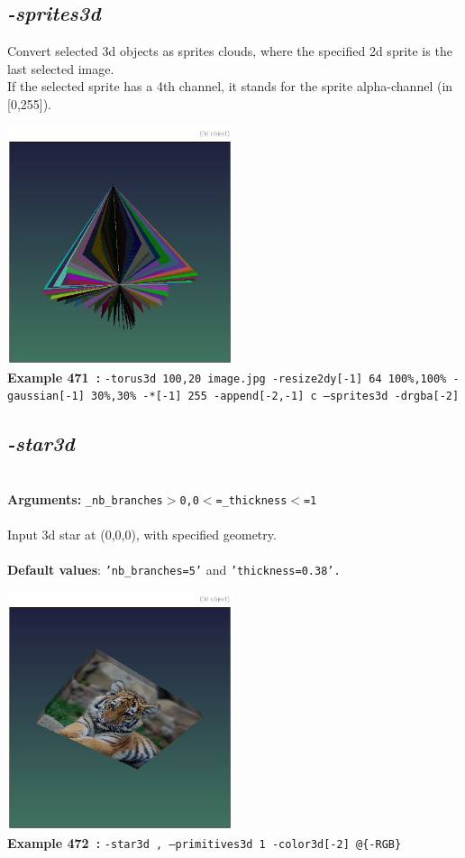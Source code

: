 \documentclass[a4paper,11pt,twoside]{book}
\begin{document}
\subsection{\emph{-sprites3d} }\vspace*{-0.5em}
Convert selected 3d objects as sprites clouds, where the specified 2d sprite is the last selected image.
~\\If the selected sprite has a 4th channel, it stands for the sprite alpha-channel (in [0,255]).
\begin{center}\includegraphics[keepaspectratio=true,height=7cm,width=\textwidth]{img/gmic_def471.jpg}\\
{\footnotesize \textbf{Example 471~:} \texttt{-torus3d 100,20 image.jpg -resize2dy[-1] 64 100\%,100\% -gaussian[-1] 30\%,30\% -*[-1] 255 -append[-2,-1] c --sprites3d -drgba[-2]}}
\end{center}

\subsection{\emph{-star3d} }\vspace*{-0.5em}
~\\\textbf{Arguments: } 
{\small \texttt{\_nb\_branches$>$0,0$<$=\_thickness$<$=1}}\\~\\
Input 3d star at (0,0,0), with specified geometry.
~\\~\\\textbf{Default values}: {\small \texttt{'nb\_branches=5'} and \texttt{'thickness=0.38'.}}
\begin{center}\includegraphics[keepaspectratio=true,height=7cm,width=\textwidth]{img/gmic_def472.jpg}\\
{\footnotesize \textbf{Example 472~:} \texttt{-star3d , --primitives3d 1 -color3d[-2] @\{-RGB\}}}
\end{center}
\end{document}
